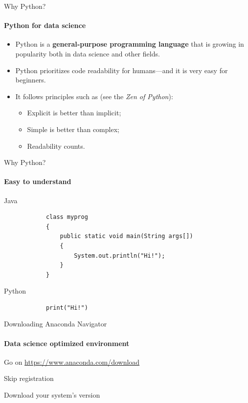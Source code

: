 \documentclass[notes,11pt, aspectratio=169, xcolor=table]{beamer}
\newenvironment{wideitemize}{\itemize\addtolength{\itemsep}{10pt}}{\enditemize}
\begin{document}
    \begin{frame}{Why Python?}
    \framesubtitle{Python for data science}
        
        \begin{itemize}
          \item Python is a \textbf{general‑purpose programming language} that is growing in popularity both in data science and other fields.
          \item Python prioritizes code readability for humans—and it is very easy for beginners.
          \item It follows principles such as (see the \textit{Zen of Python}):
             \begin{itemize}
                \item Explicit is better than implicit;
                \item Simple is better than complex;
                \item Readability counts.
            \end{itemize}
        \end{itemize}

    \end{frame}
    
    \begin{frame}[fragile=singleslide]{Why Python?}
    \framesubtitle{Easy to understand}

    \begin{block}{Java}
        \begin{verbatim}
            class myprog
            {
                public static void main(String args[])
                {
                    System.out.println("Hi!");
                }
            }
                    \end{verbatim}
    \end{block}
    
    \begin{alertblock}{Python}
        \begin{verbatim}
            print("Hi!")
        \end{verbatim}
    \end{alertblock}

    \end{frame}

    \begin{frame}{Downloading Anaconda Navigator}
    \framesubtitle{Data science optimized environment}

    
    \begin{wideitemize}
        \item Go on \url{https://www.anaconda.com/download}
        \item Skip registration
        \item Download your system's version
    \end{wideitemize}

    \end{frame}
    
\end{document}
